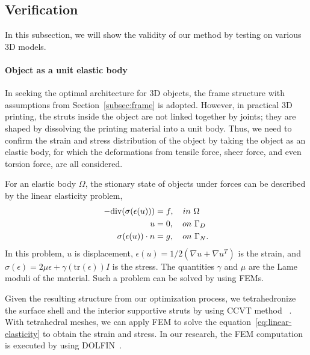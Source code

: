 
\subsection{Verification}
\label{subsec:verification}


In this subsection, we will show the validity of our method by testing on various 3D models.


\paragraph{Object as a unit elastic body}
In seeking the optimal architecture for 3D objects, the frame structure with assumptions from Section~\ref{subsec:frame} is adopted.
However, in practical 3D printing, the struts inside the object are not linked together by joints;
they are shaped by dissolving the printing material into a unit body.
Thus, we need to confirm the strain and stress distribution of the object by taking the object as an elastic body, for which the deformations from tensile force, sheer force, and even torsion force, are all considered.



For an elastic body $\Omega$, the stionary state of objects under forces can be described by the linear elasticity problem,
\begin{align}\label{eq:linear-elasticity}
     -\mbox{div}(\sigma(\epsilon(u))) & = f, \quad in\ \Omega \notag \\
                             u & = 0, \quad on\ \Gamma_D \\
          \sigma(\epsilon(u))\cdot n & = g, \quad on\ \Gamma_N. \notag
\end{align}
In this problem, $u$ is displacement, $\epsilon(u)=1/2(\nabla u+\nabla u^T)$ is the strain,
and $\sigma(\epsilon)=2\mu\epsilon+\gamma(\mathrm{tr}(\epsilon))I$ is the stress.
The quantities $\gamma$ and $\mu$ are the Lame moduli of the material. Such a problem can be solved by using FEMs.



Given the resulting structure from our optimization process, we tetrahedronize the surface shell and the interior supportive struts by using
CCVT method ~\cite{Yan:2010}.
With tetrahedral meshes, we can apply FEM to solve the equation~\eqref{eq:linear-elasticity} to
obtain the strain and stress. In our research, the FEM computation is executed by using DOLFIN~\cite{DOLFIN}.


